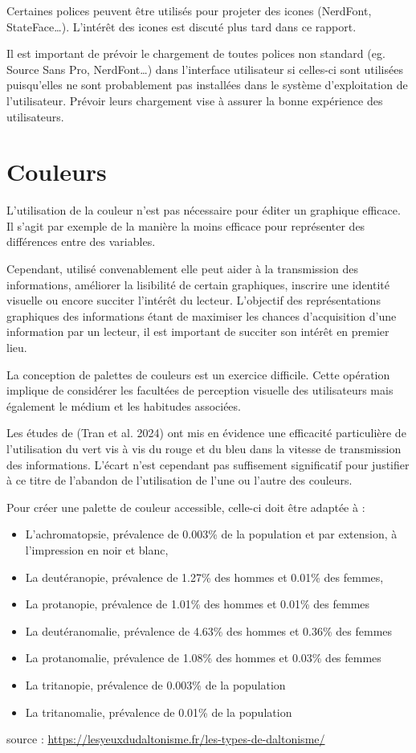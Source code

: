 \documentclass[a4paper,12pt]{article}
\begin{document}
\begin{multicols}{2}
Certaines polices peuvent être utilisés pour projeter des icones (NerdFont, StateFace\ldots{}).\autocite{jonathanschwabishQualitative2021} L'intérêt des icones est discuté plus tard dans ce rapport.

Il est important de prévoir le chargement de toutes polices non standard (eg. Source Sans Pro, NerdFont\ldots{}) dans l'interface utilisateur si celles-ci sont utilisées puisqu'elles ne sont probablement pas installées dans le système d'exploitation de l'utilisateur. Prévoir leurs chargement vise à assurer la bonne expérience des utilisateurs.
\section*{Couleurs}
\label{sec:org61e9bd2}
L'utilisation de la couleur n'est pas nécessaire pour éditer un graphique efficace. Il s'agit par exemple de la manière la moins efficace pour représenter des différences entre des variables. \autocite{beechamUseGlyphmapsAnalysing2021}

Cependant, utilisé convenablement elle peut aider à la transmission des informations, améliorer la lisibilité de certain graphiques, inscrire une identité visuelle ou encore succiter l'intérêt du lecteur. L'objectif des représentations graphiques des informations étant de maximiser les chances d'acquisition d'une information par un lecteur, il est important de succiter son intérêt en premier lieu. \autocite[sur l'esthétisme?]{Références}

La conception de palettes de couleurs est un exercice difficile. Cette opération implique de considérer les facultées de perception visuelle des utilisateurs mais également le médium et les habitudes associées.

Les études de (Tran et al. 2024) ont mis en évidence une efficacité particulière de l'utilisation du vert vis à vis du rouge et du bleu dans la vitesse de transmission des informations. L'écart n'est cependant pas suffisement significatif pour justifier à ce titre de l'abandon de l'utilisation de l'une ou l'autre des couleurs. 

Pour créer une palette de couleur accessible, celle-ci doit être adaptée à :
\begin{itemize}
\item L'achromatopsie, prévalence de 0.003\% de la population et par extension, à l'impression en noir et blanc,\autocite{andreaskrauseBestPracticesData2024}
\item La deutéranopie, prévalence de 1.27\% des hommes et 0.01\% des femmes,
\item La protanopie, prévalence de 1.01\% des hommes et 0.01\% des femmes
\item La deutéranomalie, prévalence de 4.63\% des hommes et 0.36\% des femmes
\item La protanomalie, prévalence de 1.08\% des hommes et 0.03\% des femmes
\item La tritanopie, prévalence de 0.003\% de la population
\item La tritanomalie, prévalence de 0.01\% de la population
\end{itemize}
source : \url{https://lesyeuxdudaltonisme.fr/les-types-de-daltonisme/}


\end{multicols}
\end{document}
